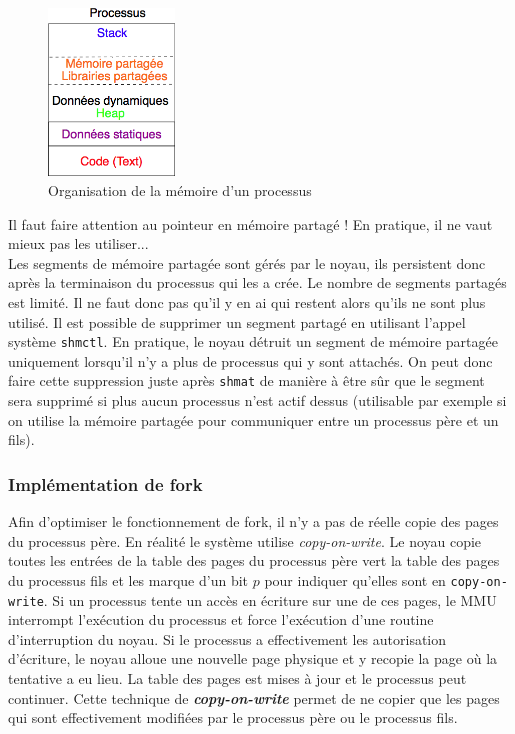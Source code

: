 \begin{figure}
  \vspace{-0.5cm}
  \includegraphics[width=0.3\textwidth]{mempart}
  \caption{\label{fig:mempart}Organisation de la mémoire d'un processus}
\end{figure}
Il faut faire attention au pointeur en mémoire partagé ! En pratique, il ne vaut mieux pas les utiliser...\\

Les segments de mémoire partagée sont gérés par le noyau, ils persistent donc après la terminaison du processus qui les a crée. Le nombre de segments partagés est limité. Il ne faut donc pas qu'il y en ai qui restent alors qu'ils ne sont plus utilisé. Il est possible de supprimer un segment partagé en utilisant l'appel système \texttt{shmctl}. En pratique, le noyau détruit un segment de mémoire partagée uniquement lorsqu'il n'y a plus de processus qui y sont attachés. On peut donc faire cette suppression juste après \texttt{shmat} de manière à être sûr que le segment sera supprimé si plus aucun processus n'est actif dessus (utilisable par exemple si on utilise la mémoire partagée pour communiquer entre un processus père et un fils).


\subsubsection{Implémentation de fork}
Afin d'optimiser le fonctionnement de fork, il n'y a pas de réelle copie des pages du processus père. En réalité le système utilise \textit{copy-on-write}. Le noyau copie toutes les entrées de la table des pages du processus père vert la table des pages du processus fils et les marque d'un bit $p$ pour indiquer qu'elles sont en \texttt{copy-on-write}.  Si un processus tente un accès en écriture sur une de ces pages, le MMU interrompt l'exécution du processus et force l'exécution d'une routine d'interruption du noyau. Si le processus a effectivement les autorisation d'écriture, le noyau alloue une nouvelle page physique et y recopie la page  où la tentative a eu lieu. La table des pages est mises à jour et le processus peut continuer. Cette technique de \textit{\textbf{copy-on-write}} permet de ne copier que les pages qui sont effectivement modifiées par le processus père ou le processus fils.
